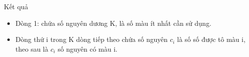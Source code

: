 Kết quả  
\begin{itemize}
	\item     Dòng 1: chứa số nguyên dương K, là số màu ít nhất cần sử dụng.   
	\item     Dòng thứ i trong K dòng tiếp theo chứa số nguyên $c_{i}$    là số số được tô màu i, theo sau là $c_{i}$    số nguyên có màu i.   
\end{itemize}